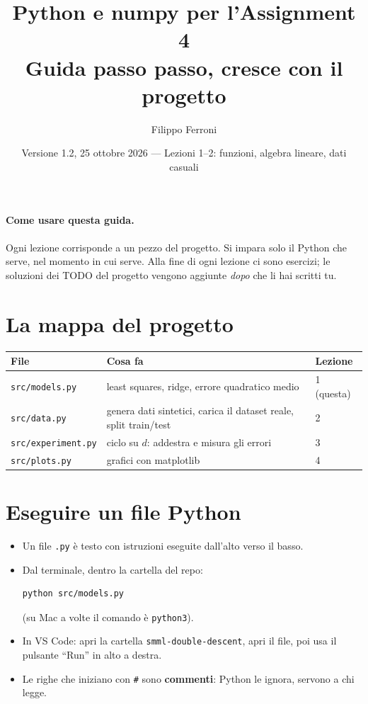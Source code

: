 \documentclass[11pt,a4paper]{article}
\title{Python e numpy per l'Assignment 4\\\large Guida passo passo, cresce con il progetto}
\author{Filippo Ferroni}
\date{Versione 1.2, 25 ottobre 2026 --- Lezioni 1--2: funzioni, algebra lineare, dati casuali}
\begin{document}
\maketitle

\paragraph{Come usare questa guida.}
Ogni lezione corrisponde a un pezzo del progetto. Si impara solo il Python che serve, nel momento in cui serve.
Alla fine di ogni lezione ci sono esercizi; le soluzioni dei TODO del progetto vengono aggiunte \emph{dopo} che li hai scritti tu.

\tableofcontents

\section{La mappa del progetto}
\begin{center}
\begin{tabular}{@{}lll@{}}
\toprule
File & Cosa fa & Lezione \\
\midrule
\texttt{src/models.py} & least squares, ridge, errore quadratico medio & 1 (questa) \\
\texttt{src/data.py} & genera dati sintetici, carica il dataset reale, split train/test & 2 \\
\texttt{src/experiment.py} & ciclo su $d$: addestra e misura gli errori & 3 \\
\texttt{src/plots.py} & grafici con matplotlib & 4 \\
\bottomrule
\end{tabular}
\end{center}

\section{Eseguire un file Python}
\begin{itemize}
  \item Un file \texttt{.py} è testo con istruzioni eseguite dall'alto verso il basso.
  \item Dal terminale, dentro la cartella del repo:
\begin{lstlisting}
python src/models.py
\end{lstlisting}
        (su Mac a volte il comando è \texttt{python3}).
  \item In VS Code: apri la cartella \texttt{smml-double-descent}, apri il file, poi usa il pulsante ``Run'' in alto a destra.
  \item Le righe che iniziano con \texttt{\#} sono \textbf{commenti}: Python le ignora, servono a chi legge.
\end{itemize}
\end{document}
